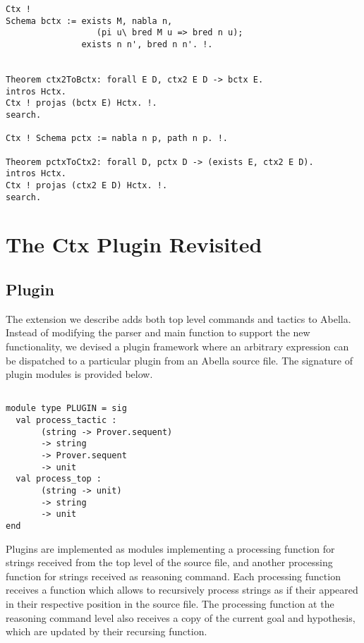 \documentclass[nocopyrightspace,authoryear]{sigplanconf}
\begin{document}
\begin{itemize}
\begin{lstlisting}
Ctx !
Schema bctx := exists M, nabla n, 
                  (pi u\ bred M u => bred n u);
               exists n n', bred n n'. !.


Theorem ctx2ToBctx: forall E D, ctx2 E D -> bctx E.
intros Hctx. 
Ctx ! projas (bctx E) Hctx. !.
search.

Ctx ! Schema pctx := nabla n p, path n p. !.

Theorem pctxToCtx2: forall D, pctx D -> (exists E, ctx2 E D).
intros Hctx. 
Ctx ! projas (ctx2 E D) Hctx. !. 
search.

\end{lstlisting}


\end{itemize}

\section{The Ctx Plugin Revisited}
\subsection{Plugin}
The extension we describe adds both top level commands and tactics to Abella. Instead of modifying the parser and main function to support the new functionality, we devised a plugin framework where an arbitrary expression can be dispatched to a particular plugin from an Abella source file. The signature of plugin modules is provided below.

\begin{lstlisting}

module type PLUGIN = sig 
  val process_tactic : 
       (string -> Prover.sequent) 
       -> string 
       -> Prover.sequent 
       -> unit
  val process_top : 
       (string -> unit) 
       -> string 
       -> unit
end

\end{lstlisting}

Plugins are implemented as modules implementing a processing function for strings received from the top level of the source file, and another processing function for strings received as reasoning command. Each processing function receives a function which allows to recursively process strings as if their appeared in their respective position in the source file. The processing function at the reasoning command level also receives a copy of the current goal and hypothesis, which are updated by their recursing function.
\end{document}
